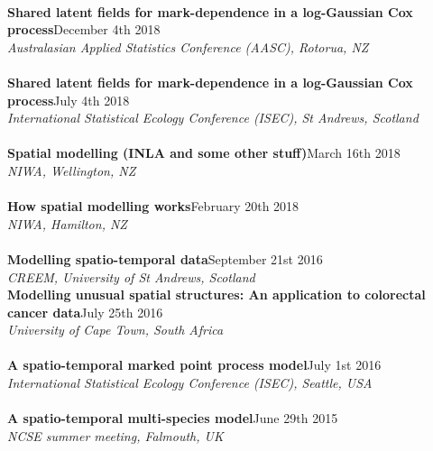\documentclass[10pt,letter]{article}
\begin{document}
                                               \hdashrule[0.5ex]{4cm}{1pt}{1pt}\\
                                                         {\textbf{Shared latent fields for mark-dependence in a log-Gaussian Cox process}}\hfill December 4th 2018\\
                                                         {\sl Australasian Applied Statistics Conference (AASC), Rotorua, NZ}\\
 \hdashrule[0.5ex]{4cm}{1pt}{1pt}\\
{\textbf{Shared latent fields for mark-dependence in a log-Gaussian Cox process}}\hfill July 4th 2018\\
 {\sl International Statistical Ecology Conference (ISEC), St Andrews, Scotland}\\
 \hdashrule[0.5ex]{4cm}{1pt}{1pt}\\
{\textbf{Spatial modelling (INLA and some other stuff)}}\hfill March 16th 2018\\
 {\sl NIWA, Wellington, NZ}\\
 \hdashrule[0.5ex]{4cm}{1pt}{1pt}\\
 \noindent
{\textbf{How spatial modelling works}}\hfill February 20th 2018\\
 {\sl NIWA, Hamilton, NZ}\\
\hdashrule[0.5ex]{4cm}{1pt}{1pt}\\
{\textbf{Modelling spatio-temporal data}}\hfill September 21st 2016\\
 {\sl CREEM, University of St Andrews, Scotland}\\
 \newpage
 \noindent
{\textbf{Modelling unusual spatial structures: An application to colorectal cancer data}}\hfill July 25th 2016\\
 {\sl University of Cape Town, South Africa}\\
\hdashrule[0.5ex]{4cm}{1pt}{1pt}\\
{\textbf{A spatio-temporal marked point process model}}\hfill July 1st 2016\\
 {\sl International Statistical Ecology Conference (ISEC), Seattle, USA}\\
  \hdashrule[0.5ex]{4cm}{1pt}{1pt}\\
 {\textbf{A spatio-temporal multi-species model}}\hfill June 29th 2015\\
 {\sl NCSE summer meeting, Falmouth, UK}\\
 \hdashrule[0.5ex]{4cm}{1pt}{1pt}\\
\end{document}
